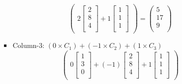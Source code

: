 \documentclass[a4paper,11pt]{article}
\numberwithin{equation}{section}
\begin{document}
\begin{itemize}
\begin{itemize}
\begin{itemize}
\[\begin{pmatrix}
                        2
                        \begin{bmatrix}
                            2\\
                            8\\
                            4\\
                        \end{bmatrix}+
                        1
                        \begin{bmatrix}
                            1\\
                            1\\
                            1\\
                        \end{bmatrix}
                    \end{pmatrix}
                    =
                    \begin{pmatrix}
                        5\\
                        17\\
                        9\\
                    \end{pmatrix}
                    \]
                    \item Column-3:
                    $(0 \times C_1) + (-1 \times C_2) + (1 \times C_3)$
                    \[
                    \begin{pmatrix}
                        0
                        \begin{bmatrix}
                            1 \\
                            3\\
                            0\\
                        \end{bmatrix}+
                        (-1)
                        \begin{bmatrix}
                            2\\
                            8\\
                            4\\
                        \end{bmatrix}+
                        1
                        \begin{bmatrix}
                            1\\
                            1\\
                            1\\

\end{bmatrix}
\end{pmatrix}\]
\end{itemize}
\end{itemize}
\end{itemize}
\end{document}
